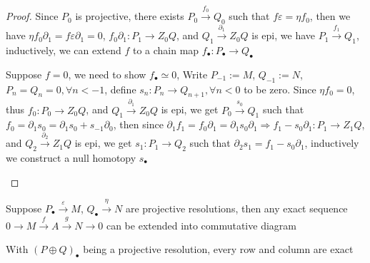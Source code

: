 \documentclass[../main.tex]{subfiles}
\begin{document}
\begin{proof}
Since $P_0$ is projective, there exists $P_0\xrightarrow{f_0}Q_0$ such that $f\varepsilon=\eta f_0$, then we have $\eta f_0\partial_1=f\varepsilon\partial_1=0$, $f_0\partial_1:P_1\to Z_0Q$, and $Q_1\xrightarrow{\partial_1}Z_0Q$ is epi, we have $P_1\xrightarrow{f_1}Q_1$, inductively, we can extend $f$ to a chain map $f_\bullet:P_\bullet\to Q_\bullet$ \par
Suppose $f=0$, we need to show $f_\bullet\simeq0$, Write $P_{-1}:=M$, $Q_{-1}:=N$, $P_n=Q_n=0,\forall n<-1$, define $s_n:P_n\to Q_{n+1},\forall n<0$ to be zero. Since $\eta f_0=0$, thus $f_0:P_0\to Z_0Q$, and $Q_1\xrightarrow{\partial_1}Z_0Q$ is epi, we get $P_0\xrightarrow{s_0}Q_1$ such that $f_0=\partial_1s_0=\partial_1s_0+s_{-1}\partial_0$, then since $\partial_1f_1=f_0\partial_1=\partial_1s_0\partial_1\Rightarrow f_1-s_0\partial_1:P_1\to Z_1Q$, and $Q_2\xrightarrow{\partial_2}Z_1Q$ is epi, we get $s_1:P_1\to Q_2$ such that $\partial_2s_1=f_1-s_0\partial_1$, inductively we construct a null homotopy $s_\bullet$
\begin{center}
\end{center}
\end{proof}

\begin{lemma}\label{Horseshoe lemma}
Suppose $P_\bullet\xrightarrow{\varepsilon} M$, $Q_\bullet\xrightarrow{\eta} N$ are projective resolutions, then any exact sequence $0\to M\xrightarrow{f}A\xrightarrow{g}N\to0$ can be extended into commutative diagram
\begin{center}
\end{center}
With $(P\oplus Q)_\bullet$ being a projective resolution, every row and column are exact
\end{lemma}
\end{document}
